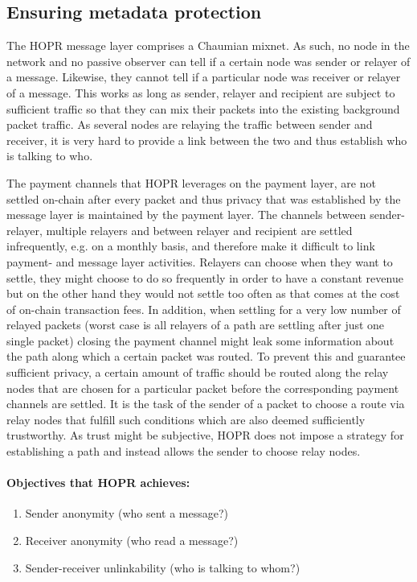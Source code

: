 \documentclass{article}
\begin{document}
\subsection{Ensuring metadata protection}
The HOPR message layer comprises a Chaumian mixnet. As such, no node in the network and no passive observer can tell if a certain node was sender or relayer of a message. Likewise, they cannot tell if a particular node was receiver or relayer of a message. This works as long as sender, relayer and recipient are subject to sufficient traffic so that they can mix their packets into the existing background packet traffic. As several nodes are relaying the traffic between sender and receiver, it is very hard to provide a link between the two and thus establish who is talking to who.

The payment channels that HOPR leverages on the payment layer, are not settled on-chain after every packet and thus privacy that was established by the message layer is maintained by the payment layer. The channels between sender-relayer, multiple relayers and between relayer and recipient are settled infrequently, e.g. on a monthly basis, and therefore make it difficult to link payment- and message layer activities. Relayers can choose when they want to settle, they might choose to do so frequently in order to have a constant revenue but on the other hand they would not settle too often as that comes at the cost of on-chain transaction fees. In addition, when settling for a very low number of relayed packets (worst case is all relayers of a path are settling after just one single packet) closing the payment channel might leak some information about the path along which a certain packet was routed. To prevent this and guarantee sufficient privacy, a certain amount of traffic should be routed along the relay nodes that are chosen for a particular packet before the corresponding payment channels are settled. It is the task of the sender of a packet to choose a route via relay nodes that fulfill such conditions which are also deemed sufficiently trustworthy. As trust might be subjective, HOPR does not impose a strategy for establishing a path and instead allows the sender to choose relay nodes.

\paragraph{Objectives that HOPR achieves:}

\begin{enumerate}
    \item Sender anonymity (who sent a message?)
    \item Receiver anonymity (who read a message?)
    \item Sender-receiver unlinkability (who is talking to whom?)
\end{enumerate}
\end{document}
